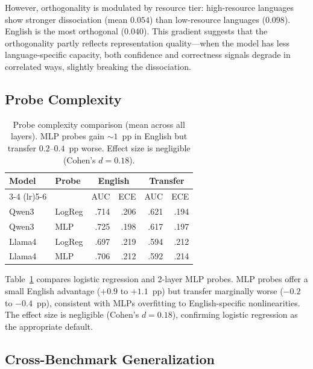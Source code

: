 \documentclass[11pt,a4paper]{article}
\begin{document}
However, orthogonality is modulated by resource tier: high-resource languages show stronger dissociation (mean $0.054$) than low-resource languages ($0.098$).
English is the most orthogonal ($0.040$).
This gradient suggests that the orthogonality partly reflects representation quality---when the model has less language-specific capacity, both confidence and correctness signals degrade in correlated ways, slightly breaking the dissociation.

\subsection{Probe Complexity}
\label{sec:probe_complexity}

\begin{table}[t]
\centering
\small
\begin{tabular}{llrrrr}
\toprule
\textbf{Model} & \textbf{Probe} & \multicolumn{2}{c}{\textbf{English}} & \multicolumn{2}{c}{\textbf{Transfer}} \\
\cmidrule(lr){3-4} \cmidrule(lr){5-6}
& & AUC & ECE & AUC & ECE \\
\midrule
Qwen3  & LogReg & .714 & .206 & .621 & .194 \\
Qwen3  & MLP    & .725 & .198 & .617 & .197 \\
Llama4 & LogReg & .697 & .219 & .594 & .212 \\
Llama4 & MLP    & .706 & .212 & .592 & .214 \\
\bottomrule
\end{tabular}
\caption{Probe complexity comparison (mean across all layers). MLP probes gain ${\sim}1$~pp in English but transfer $0.2$--$0.4$~pp worse. Effect size is negligible (Cohen's $d{=}0.18$).}
\label{tab:probe_complexity}
\end{table}

Table~\ref{tab:probe_complexity} compares logistic regression and 2-layer MLP probes.
MLP probes offer a small English advantage ($+0.9$ to $+1.1$~pp) but transfer marginally worse ($-0.2$ to $-0.4$~pp), consistent with MLPs overfitting to English-specific nonlinearities.
The effect size is negligible (Cohen's $d{=}0.18$), confirming logistic regression as the appropriate default.

\subsection{Cross-Benchmark Generalization}
\end{document}
